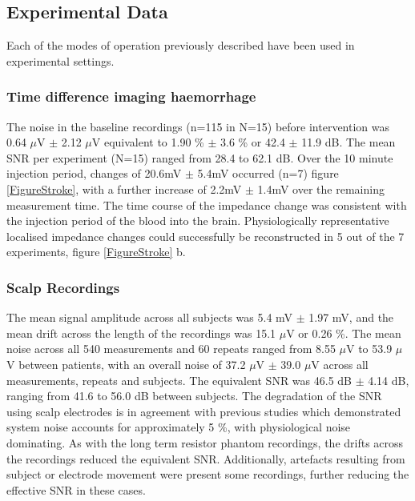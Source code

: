 \subsection{Experimental Data}

Each of the modes of operation previously described have been used in experimental settings. 

\subsubsection{Time difference  imaging haemorrhage}
The noise in the baseline recordings (n=115 in N=15) before intervention was 0.64 $\mu$V $\pm$ 2.12 $\mu$V equivalent to 1.90 \% $\pm$ 3.6 \% or 42.4 $\pm$ 11.9 dB. The mean SNR per experiment (N=15) ranged from 28.4 to 62.1 dB. Over the 10 minute injection period, changes of 20.6mV \(\pm\) 5.4mV occurred (n=7) figure \ref{FigureStroke}, with a further increase of 2.2mV \(\pm\) 1.4mV over the remaining measurement time. The time course of the impedance change was consistent with the injection period of the blood into the brain. Physiologically representative localised impedance changes could successfully be reconstructed in 5 out of the 7 experiments, figure \ref{FigureStroke} b. 


\subsubsection{Scalp Recordings}
The mean signal amplitude across all subjects was 5.4 mV $\pm$ 1.97 mV, and the mean drift across the length of the recordings was 15.1 $\mu$V or 0.26 \%. The mean noise across all 540 measurements and 60 repeats ranged from 8.55 $\mu$V to 53.9 $\mu$V between patients, with an overall noise of 37.2  $\mu$V $\pm$ 39.0 $\mu$V across all measurements, repeats and subjects. The equivalent SNR was 46.5 dB $\pm$ 4.14 dB, ranging from 41.6 to 56.0 dB between subjects. The degradation of the SNR using scalp electrodes is in agreement with previous studies \cite{fabrizi2007analysis} which demonstrated system noise accounts for approximately 5 \%, with physiological noise dominating. As with the long term resistor phantom recordings, the drifts across the recordings reduced the equivalent SNR. Additionally, artefacts resulting from subject or electrode movement were present some recordings, further reducing the effective SNR in these cases.  


